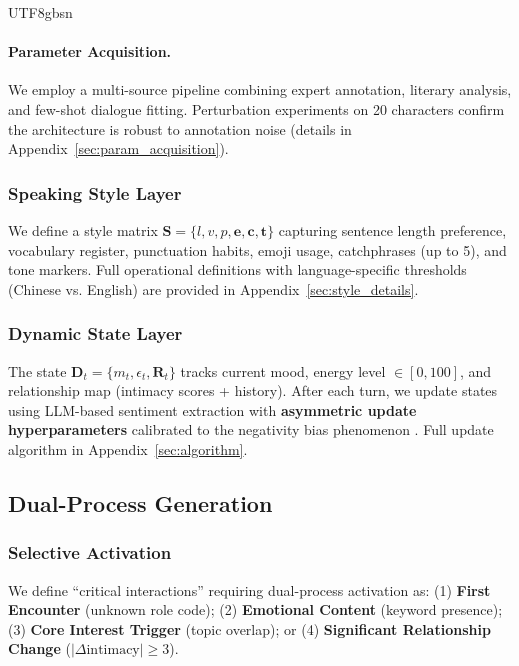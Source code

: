 \documentclass[11pt]{article}
\begin{document}
\begin{CJK*}{UTF8}{gbsn}
\paragraph{Parameter Acquisition.} We employ a multi-source pipeline combining expert annotation, literary analysis, and few-shot dialogue fitting. Perturbation experiments on 20 characters confirm the architecture is robust to annotation noise (details in Appendix~\ref{sec:param_acquisition}).

\subsubsection{Speaking Style Layer}

We define a style matrix $\mathbf{S} = \{l, v, p, \mathbf{e}, \mathbf{c}, \mathbf{t}\}$ capturing sentence length preference, vocabulary register, punctuation habits, emoji usage, catchphrases (up to 5), and tone markers. Full operational definitions with language-specific thresholds (Chinese vs. English) are provided in Appendix~\ref{sec:style_details}.

\subsubsection{Dynamic State Layer}

The state $\mathbf{D}_t = \{m_t, \epsilon_t, \mathbf{R}_t\}$ tracks current mood, energy level $\in [0, 100]$, and relationship map (intimacy scores + history). After each turn, we update states using LLM-based sentiment extraction with \textbf{asymmetric update hyperparameters} calibrated to the negativity bias phenomenon \citep{baumeister2001bad}. Full update algorithm in Appendix~\ref{sec:algorithm}.

\subsection{Dual-Process Generation}

\subsubsection{Selective Activation}
\label{sec:trigger}

We define ``critical interactions'' requiring dual-process activation as: (1) \textbf{First Encounter} (unknown role code); (2) \textbf{Emotional Content} (keyword presence); (3) \textbf{Core Interest Trigger} (topic overlap); or (4) \textbf{Significant Relationship Change} ($|\Delta\text{intimacy}| \geq 3$).


\end{CJK*}
\end{document}
